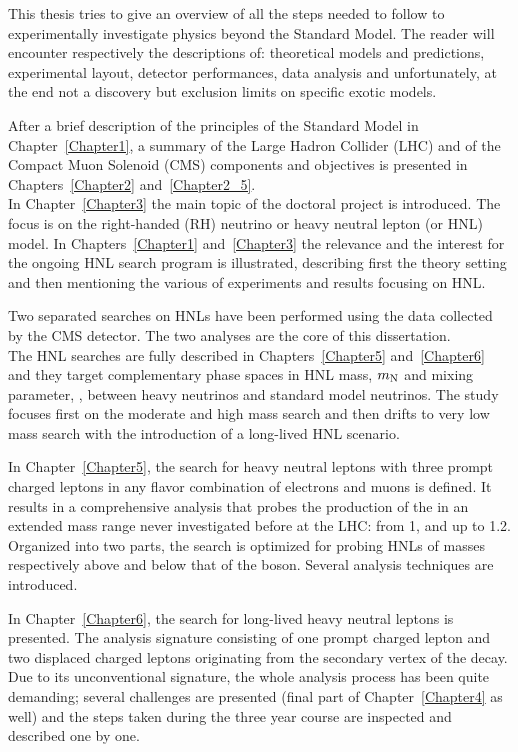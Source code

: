This thesis tries to give an overview of all the steps needed to follow
to experimentally investigate physics
beyond the Standard Model. The reader will encounter respectively the
descriptions of: theoretical models and predictions, experimental
layout, detector performances, data analysis and unfortunately, at the
end not a discovery but exclusion limits on specific exotic models.

After a brief description of the principles of the Standard Model in
Chapter~\ref{Chapter1}, a summary of the Large Hadron Collider (LHC)
and of the Compact Muon Solenoid (CMS) components and objectives is
presented in Chapters~\ref{Chapter2} and~\ref{Chapter2_5}.\\
In Chapter~\ref{Chapter3} the main topic of the doctoral project is
introduced. The focus is on the right-handed (RH) neutrino or heavy
neutral lepton (\hnl or HNL)
model. In Chapters~\ref{Chapter1} and~\ref{Chapter3} 
the relevance and the interest for the
ongoing HNL search program is illustrated, describing first the theory setting 
and then mentioning the various of experiments and results
focusing on HNL.

Two separated searches on HNLs have been performed using the data
collected by the CMS detector. The two analyses are the core of this
dissertation.\\
The HNL searches are fully described in Chapters~\ref{Chapter5}
and~\ref{Chapter6} and they target complementary phase spaces in HNL mass, $m_\mathrm{N}$
and mixing parameter, \mixpar, between heavy neutrinos and standard
model neutrinos. The study focuses first on the
moderate and high mass search and then drifts to very low mass search with
the introduction of a long-lived HNL scenario.

In Chapter~\ref{Chapter5}, the search for heavy neutral leptons with three
prompt charged leptons in any flavor combination of electrons and
muons is defined. It results in a comprehensive analysis that probes the production of the
\hnl in an extended mass range never investigated before at the LHC:
from 1\GeV, and up to 1.2\TeV. 
Organized into two parts, the search is optimized for
probing HNLs of masses respectively above and below that of the \PW
boson. Several analysis techniques are introduced.

In Chapter~\ref{Chapter6}, the search for long-lived heavy neutral
leptons is presented. The analysis signature
consisting of one prompt charged lepton and two displaced
charged leptons originating from the secondary vertex of the \hnl
decay. Due to its unconventional signature, the whole analysis process has been
quite demanding; several challenges are presented (final part of
Chapter~\ref{Chapter4} as well) and the steps taken during the three
year course are inspected and described one by one.

